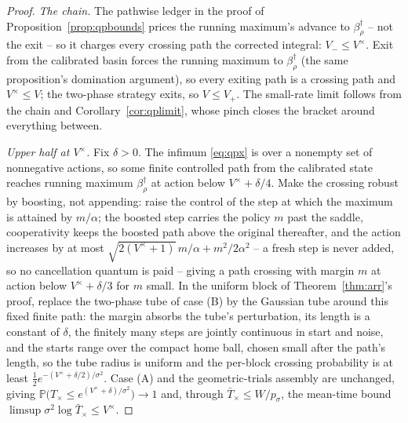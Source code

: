 \documentclass[11pt]{article}
\theoremstyle{definition}
\theoremstyle{remark}
\numberwithin{equation}{section}
\begin{document}
\begin{proof}
\emph{The chain.} The pathwise ledger in the proof of Proposition~\ref{prop:qpbounds} prices the running maximum's advance to $\beta^\dagger_\rho$ -- not the exit -- so it charges every crossing path the corrected integral: $V_- \le V^{\times}$. Exit from the calibrated basin forces the running maximum to $\beta^\dagger_\rho$ (the same proposition's domination argument), so every exiting path is a crossing path and $V^{\times} \le V$; the two-phase strategy exits, so $V \le V_+$. The small-rate limit follows from the chain and Corollary~\ref{cor:qplimit}, whose pinch closes the bracket around everything between.

\emph{Upper half at $V^{\times}$.} Fix $\delta > 0$. The infimum \eqref{eq:qpx} is over a nonempty set of nonnegative actions, so some finite controlled path from the calibrated state reaches running maximum $\beta^\dagger_\rho$ at action below $V^{\times} + \delta/4$. Make the crossing robust by boosting, not appending: raise the control of the step at which the maximum is attained by $m/\alpha$; the boosted step carries the policy $m$ past the saddle, cooperativity keeps the boosted path above the original thereafter, and the action increases by at most $\sqrt{2(V^{\times}+1)}\,m/\alpha + m^2/2\alpha^2$ -- a fresh step is never added, so no cancellation quantum is paid -- giving a path crossing with margin $m$ at action below $V^{\times} + \delta/3$ for $m$ small. In the uniform block of Theorem~\ref{thm:arr}'s proof, replace the two-phase tube of case (B) by the Gaussian tube around this fixed finite path: the margin absorbs the tube's perturbation, its length is a constant of $\delta$, the finitely many steps are jointly continuous in start and noise, and the starts range over the compact home ball, chosen small after the path's length, so the tube radius is uniform and the per-block crossing probability is at least $\tfrac12 e^{-(V^{\times}+\delta/2)/\sigma^2}$. Case (A) and the geometric-trials assembly are unchanged, giving $\mathbb{P}\bigl(T_{\times} \le e^{(V^{\times}+\delta)/\sigma^2}\bigr) \to 1$ and, through $\bar T_{\times} \le W/p_\sigma$, the mean-time bound $\limsup \sigma^2\log \bar T_{\times} \le V^{\times}$.


\end{proof}
\end{document}
